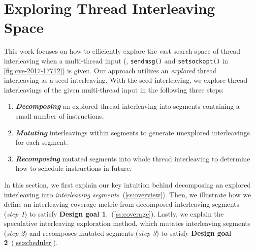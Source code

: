 \section{Exploring Thread Interleaving Space}
\label{s:design}





%

This work focuses on how to efficiently explore the vast search space
of thread interleaving when a multi-thread input (\eg,
\texttt{sendmsg()} and \texttt{setsockopt()} in
\autoref{fig:cve-2017-17712}) is given. Our approach utilizes an
\textit{explored} thread interleaving as a seed interleaving.
%
With the seed interleaving, we explore thread interleavings of the
given multi-thread input in the following three steps:
%
\begin{enumerate}[labelsep=0pt, label=\textbf{\arabic*) }]
\item \textbf{\textit{Decomposing}} an explored thread interleaving
  into segments containing a small number of instructions.
\item \textbf{\textit{Mutating}} interleavings within segments to
  generate unexplored interleavings for each segment.
\item \textbf{\textit{Recomposing}} mutated segments into whole thread
  interleaving to determine how to schedule instructions in future.
\end{enumerate}
%


\dr{}
In this section, we first explain our key intuition behind decomposing
an explored interleaving into \textit{interleaving
  segments}~(\autoref{ss:overview}).
%
Then, we illustrate how we define an interleaving coverage metric from
decomposed interleaving segments (\textit{step 1}) to satisfy
\textbf{Design goal 1}.~(\autoref{ss:coverage}).
%
%
Lastly, we explain the speculative interleaving exploration method,
which mutates interleaving segments (\textit{step 2}) and recomposes
mutated segments (\textit{step 3}) to satisfy \textbf{Design goal
  2}~(\autoref{ss:scheduler}).



